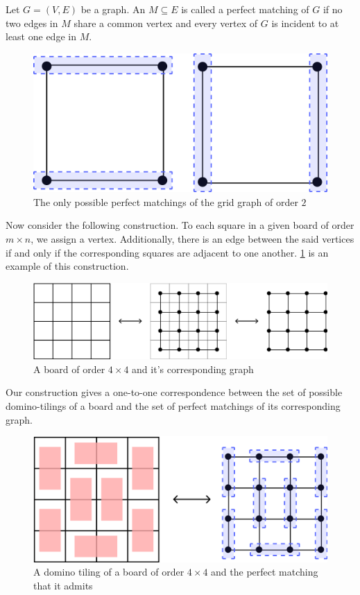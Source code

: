 \begin{definition}
Let $G=\left( V,E \right)$ be a graph. An $M\subseteq E$ is called a perfect matching of $G$ if no two edges in $M$ share a common vertex and every vertex of $G$ is incident to at least one edge in $M$.
\end{definition}
\begin{figure}[H]
	\centering
	\includegraphics[scale=0.6]{Images/Figure2.jpg}
	\caption{The only possible perfect matchings of the grid graph of order $2$}
\end{figure}
Now consider the following construction. To each square in a given board of order $m\times n$, we assign a vertex. Additionally, there is an edge between the said vertices if and only if the corresponding squares are adjacent to one another. \cref{f:1.3} is an example of this construction. 
\begin{figure}[H]
	\centering
	\includegraphics[scale=0.6]{Images/Figure3.jpg}
	\caption{A board of order $4\times 4$ and it's corresponding graph}
	\label{f:1.3}
\end{figure}
Our construction gives a one-to-one correspondence between the set of possible domino-tilings of a board and the set of perfect matchings of its corresponding graph.
\begin{figure}[H]
	\centering
	\includegraphics[scale=0.6]{Images/Figure4.png}
	\caption{A domino tiling of a board of order $4\times 4$ and the perfect matching that it admits}
\end{figure}
